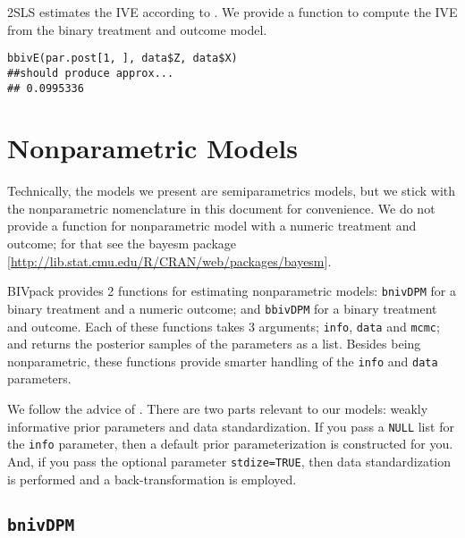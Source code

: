 \documentclass[12pt,oneside]{article}
\begin{document}
2SLS estimates the IVE according to \citet{ImbeAngr94}.  We provide a function
to compute the IVE from the binary treatment and outcome model.
\begin{verbatim}
bbivE(par.post[1, ], data$Z, data$X)
##should produce approx...
## 0.0995336
\end{verbatim}

\section{Nonparametric Models}

Technically, the models we present are semiparametrics models, but we stick with
the nonparametric nomenclature in this document for convenience.
We do not provide a function for nonparametric model with 
a numeric treatment and outcome; for that see the bayesm package 
[\url{http://lib.stat.cmu.edu/R/CRAN/web/packages/bayesm}].

BIVpack provides 2 functions for estimating nonparametric models:
\texttt{bnivDPM} for a binary treatment and a numeric outcome; and
\texttt{bbivDPM} for a binary treatment and outcome.  Each of these
functions takes 3 arguments; \texttt{info}, \texttt{data} and
\texttt{mcmc}; and returns the posterior samples of the parameters
as a list.  Besides being nonparametric, these functions provide
smarter handling of the \texttt{info} and \texttt{data} parameters.

We follow the advice of \citet{GelmJaku08}.  There
are two parts relevant to our models:  weakly informative prior
parameters and data standardization.  If you pass a \texttt{NULL} 
list for the \texttt{info} parameter, then a default prior parameterization is 
constructed for you.  And, if you pass the optional parameter
\texttt{stdize=TRUE}, then data standardization is performed
and a back-transformation is employed.


\subsection{\texttt{bnivDPM}}
\end{document}
